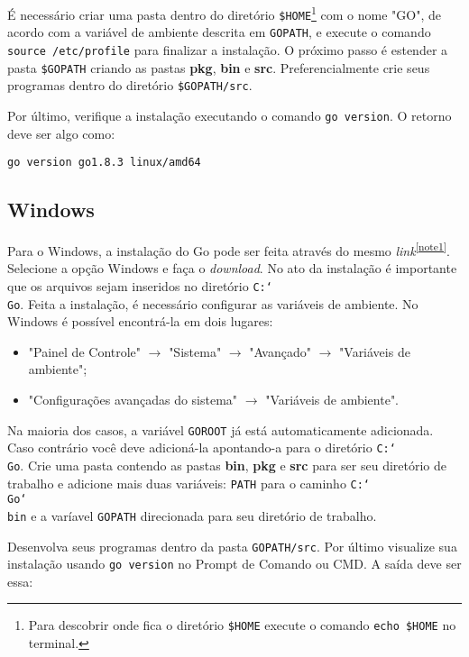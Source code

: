 \documentclass{SBCbookchapter}
\begin{document}
É necessário criar uma pasta dentro do diretório \texttt{\$HOME}\footnote{Para descobrir onde fica o diretório \texttt{\$HOME} execute o comando \texttt{echo \$HOME} no terminal.} com o nome "GO", de acordo com a variável de ambiente descrita em \texttt{GOPATH}, e execute o comando \texttt{source /etc/profile} para finalizar a instalação. O próximo passo é estender a pasta \texttt{\$GOPATH} criando as pastas \textbf{pkg}, \textbf{bin} e \textbf{src}. Preferencialmente crie seus programas dentro do diretório \texttt{\$GOPATH/src}.

Por último, verifique a instalação executando o comando \texttt{go version}. O retorno deve ser algo como:

\noindent\texttt{go version go1.8.3 linux/amd64}


\subsection{Windows}

Para o Windows, a instalação do Go pode ser feita através do mesmo \textit{link}\textsuperscript{\ref{note1}}. Selecione a opção Windows e faça o \textit{download}. No ato da instalação é importante que os arquivos sejam inseridos no diretório \texttt{C:\char`\\Go}. Feita a instalação, é necessário configurar as variáveis de ambiente. No Windows é possível encontrá-la em dois lugares:

\begin{itemize}
	\item "Painel de Controle" $\rightarrow$ "Sistema" $\rightarrow$ "Avançado" $\rightarrow$ "Variáveis de ambiente";
	\item "Configurações avançadas do sistema" $\rightarrow$ "Variáveis de ambiente".
\end{itemize}

Na maioria dos casos, a variável \texttt{GOROOT} já está automaticamente adicionada. Caso contrário você deve adicioná-la apontando-a para o diretório \texttt{C:\char`\\Go}. Crie uma pasta contendo as pastas \textbf{bin}, \textbf{pkg} e \textbf{src} para ser seu diretório de trabalho e adicione mais duas variáveis: \texttt{PATH} para o caminho \texttt{C:\char`\\Go\char`\\bin} e a varíavel \texttt{GOPATH} direcionada para seu diretório de trabalho.

Desenvolva seus programas dentro da pasta \texttt{GOPATH/src}. Por último visualize sua instalação usando \texttt{go version} no Prompt de Comando ou CMD. A saída deve ser essa:
\end{document}
